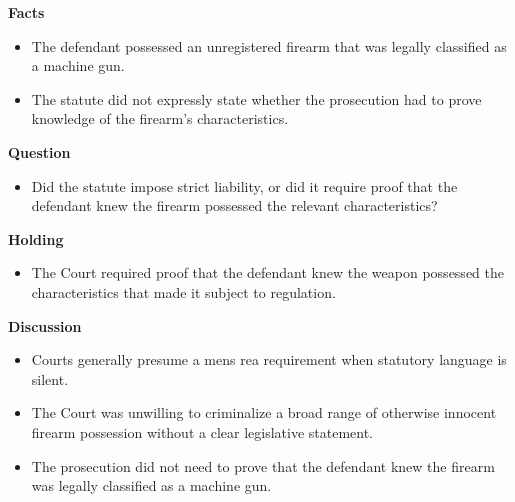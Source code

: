 \documentclass[11pt]{tex/lawoutline}
\begin{document}
{}
{
\textbf{Facts}
\begin{itemize}
    \item The defendant possessed an unregistered firearm that was legally classified as a machine gun.
    \item The statute did not expressly state whether the prosecution had to prove knowledge of the firearm's characteristics.
\end{itemize}

\textbf{Question}
\begin{itemize}
    \item Did the statute impose strict liability, or did it require proof that the defendant knew the firearm possessed the relevant characteristics?
\end{itemize}

\textbf{Holding}
\begin{itemize}
    \item The Court required proof that the defendant knew the weapon possessed the characteristics that made it subject to regulation.
\end{itemize}

\textbf{Discussion}
\begin{itemize}
    \item Courts generally presume a mens rea requirement when statutory language is silent.
    \item The Court was unwilling to criminalize a broad range of otherwise innocent firearm possession without a clear legislative statement.
    \item The prosecution did not need to prove that the defendant knew the firearm was legally classified as a machine gun.
\end{itemize}
}
\end{document}
